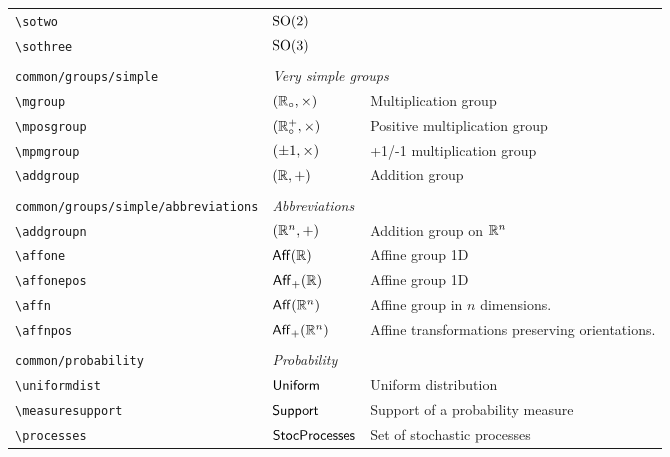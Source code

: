 \begin{longtable}{lll}
 {\color[rgb]{0.5,0.5,0.5}\texttt{\textbackslash sotwo}} & $\mathrm{SO}(2)$ & \\ 
 {\color[rgb]{0.5,0.5,0.5}\texttt{\textbackslash sothree}} & $\mathrm{SO(3)}$ & \\ 
  &  & \\ 
 {\color[rgb]{0.5,0.5,0.5}\texttt{common/groups/simple}} & \multicolumn{2}{l}{\emph{Very simple groups}}\\ 
 \hline
{\color[rgb]{0.5,0.5,0.5}\texttt{\textbackslash mgroup}} & $(\mathbb{R}_{\circ},\times)$ &  Multiplication group\\ 
 {\color[rgb]{0.5,0.5,0.5}\texttt{\textbackslash mposgroup}} & $(\mathbb{R}^{+}_{\circ},\times)$ &  Positive multiplication group\\ 
 {\color[rgb]{0.5,0.5,0.5}\texttt{\textbackslash mpmgroup}} & $(\pm1,\times)$ &  +1/-1 multiplication group\\ 
 {\color[rgb]{0.5,0.5,0.5}\texttt{\textbackslash addgroup}} & $(\mathbb{R},+)$ &  Addition group\\ 
  &  & \\ 
 {\color[rgb]{0.5,0.5,0.5}\texttt{common/groups/simple/abbreviations}} & \multicolumn{2}{l}{\emph{Abbreviations}}\\ 
 \hline
{\color[rgb]{0.5,0.5,0.5}\texttt{\textbackslash addgroupn}} & $(\mathbb{R}^n,+)$ &  Addition group on $\mathbb{R}^n$\\ 
 {\color[rgb]{0.5,0.5,0.5}\texttt{\textbackslash affone}} & $\mathsf{Aff}(\mathbb{R})$ &  Affine group 1D\\ 
 {\color[rgb]{0.5,0.5,0.5}\texttt{\textbackslash affonepos}} & $\mathsf{Aff}_{+}(\mathbb{R})$ &  Affine group 1D\\ 
 {\color[rgb]{0.5,0.5,0.5}\texttt{\textbackslash affn}} & $\mathsf{Aff}(\mathbb{R}^n)$ &  Affine group in $n$ dimensions.\\ 
 {\color[rgb]{0.5,0.5,0.5}\texttt{\textbackslash affnpos}} & $\mathsf{Aff}_{+}(\mathbb{R}^n)$ &  Affine transformations preserving orientations.\\ 
  &  & \\ 
 {\color[rgb]{0.5,0.5,0.5}\texttt{common/probability}} & \multicolumn{2}{l}{\emph{Probability}}\\ 
 \hline
{\color[rgb]{0.5,0.5,0.5}\texttt{\textbackslash uniformdist}} & $\mathsf{Uniform}$ &  Uniform distribution\\ 
 {\color[rgb]{0.5,0.5,0.5}\texttt{\textbackslash measuresupport}} & $\mathsf{Support}$ &  Support of a probability measure\\ 
 {\color[rgb]{0.5,0.5,0.5}\texttt{\textbackslash processes}} & $\mathsf{StocProcesses}$ &  Set of stochastic processes\\ 

\end{longtable}
